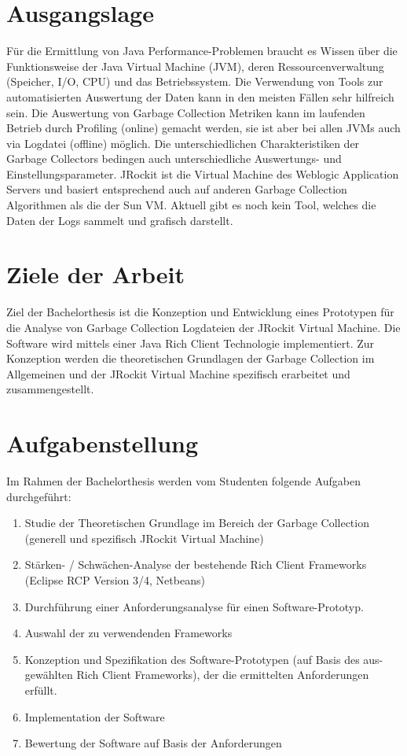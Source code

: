 \section{Ausgangslage}
Für die Ermittlung von Java Performance-Problemen braucht es Wissen über die Funktionsweise der Java Virtual Machine (JVM), deren Ressourcenverwaltung (Speicher, I/O, CPU) und das Betriebssystem. Die Verwendung von Tools zur automatisierten Auswertung der Daten kann in den meisten Fällen sehr hilfreich sein. 
Die Auswertung von Garbage Collection Metriken kann im laufenden Betrieb durch Profiling (online) gemacht werden, sie ist aber bei allen JVMs auch via Logdatei (offline) möglich. Die unterschiedlichen Charakteristiken der Garbage Collectors bedingen auch unterschiedliche Auswertungs- und Einstellungsparameter. 
JRockit ist die Virtual Machine des Weblogic Application Servers und basiert entsprechend auch auf anderen Garbage Collection Algorithmen als die der Sun VM. Aktuell gibt es noch kein Tool, welches die Daten der Logs sammelt und grafisch darstellt.


\section{Ziele der Arbeit}
Ziel der Bachelorthesis ist die Konzeption und Entwicklung eines Prototypen für die Analyse von Garbage Collection Logdateien der JRockit Virtual Machine. Die Software wird mittels einer Java Rich Client Technologie implementiert. Zur Konzeption werden die theoretischen Grundlagen der Garbage Collection im Allgemeinen und der JRockit Virtual Machine spezifisch erarbeitet und zusammengestellt.

\section{Aufgabenstellung}
Im Rahmen der Bachelorthesis werden vom Studenten folgende Aufgaben durchgeführt:

\begin{enumerate}
\item Studie der Theoretischen Grundlage im Bereich der Garbage Collection 
    (generell und spezifisch JRockit Virtual Machine)
\item Stärken- / Schwächen-Analyse der bestehende Rich Client Frameworks
    (Eclipse RCP Version 3/4, Netbeans)
\item Durchführung einer Anforderungsanalyse für einen Software-Prototyp.
\item Auswahl der zu verwendenden Frameworks
\item Konzeption und Spezifikation des Software-Prototypen (auf Basis des aus-
    gewählten Rich Client Frameworks), der die ermittelten Anforderungen erfüllt.  
\item Implementation der Software
\item Bewertung der Software auf Basis der Anforderungen
\end{enumerate}

